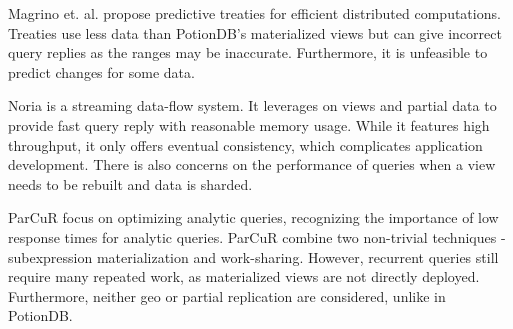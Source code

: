 \documentclass[sigplan,twocolumn,review,anonymous]{acmart}
\begin{document}
Magrino et. al. \cite{treaties} propose predictive treaties for efficient distributed computations. 
Treaties use less data than PotionDB's materialized views but can give incorrect query replies as the ranges may be inaccurate.
Furthermore, it is unfeasible to predict changes for some data.

Noria \cite{noria} is a streaming data-flow system.
It leverages on views and partial data to provide fast query reply with reasonable memory usage.
While it features high throughput, it only offers eventual consistency, which complicates application development.
There is also concerns on the performance of queries when a view needs to be rebuilt and data is sharded.

ParCuR \cite{sioulas2023real} focus on optimizing analytic queries, recognizing the importance of low response times for analytic queries.
ParCuR combine two non-trivial techniques - subexpression materialization and work-sharing.
However, recurrent queries still require many repeated work, as materialized views are not directly deployed. 
Furthermore, neither geo or partial replication are considered, unlike in PotionDB.





\end{document}
